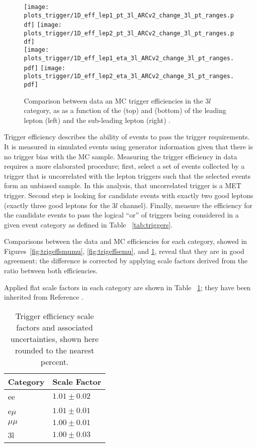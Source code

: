 \begin{figure}[htp]
\centering
\texttt{[image: plots\_trigger/1D\_eff\_lep1\_pt\_3l\_ARCv2\_change\_3l\_pt\_ranges.pdf]}
\texttt{[image: plots\_trigger/1D\_eff\_lep2\_pt\_3l\_ARCv2\_change\_3l\_pt\_ranges.pdf]} \\
\texttt{[image: plots\_trigger/1D\_eff\_lep1\_eta\_3l\_ARCv2\_change\_3l\_pt\_ranges.pdf]}
\texttt{[image: plots\_trigger/1D\_eff\_lep2\_eta\_3l\_ARCv2\_change\_3l\_pt\_ranges.pdf]}
\caption[Trigger efficiency for the $3l$ category]{Comparison between data an MC trigger efficiencies in the $3l$ category, as as a function of the \pt (top) and \etac (bottom) of the leading lepton (left) and the sub-leading lepton (right) \cite{CMS_AN_2017-029}.}
\label{fig:trigeffs3l}
\end{figure}

Trigger efficiency describes the ability of events to pass the trigger requirements. It is measured in simulated events using generator information given that there is no trigger bias with the MC sample. Measuring the trigger efficiency in data requires a more elaborated procedure; first, select a set of events collected by a trigger that is uncorrelated with the lepton triggers such that the selected events form an unbiased sample. In this analysis, that uncorrelated trigger is a MET trigger. Second step is looking for candidate events with exactly two good leptons (exactly three good leptons for the $3l$ channel). Finally,  measure the efficiency for the candidate events to pass the logical ``or'' of triggers being considered in a given event category as defined in Table ~\ref{tab:triggers}.

Comparisons between the data and MC efficiencies for each category, showed in Figures~\ref{fig:trigeffsmumu}, \ref{fig:trigeffsemu}, and \ref{fig:trigeffs3l}, reveal that they are in good agreement; the difference is corrected by applying scale factors derived from the ratio between both efficiencies.

Applied flat scale factors in each category are shown in Table ~\ref{tab:trigSFs}; they have been inherited from Reference \cite{CMS_AN_2017-029}. 
\begin{table}
\centering
\begin{tabular}{ll}
Category & Scale Factor \\\hline
    ee   & $1.01 \pm 0.02$ \\
e$\mu$   & $1.01 \pm 0.01$ \\
$\mu\mu$ & $1.00 \pm 0.01$ \\
3l       & $1.00 \pm 0.03$ \\\hline
\end{tabular}
\caption[Trigger efficiency scale factors and associated uncertainties.]{Trigger efficiency scale factors and associated uncertainties, shown here rounded to the nearest percent.}
\label{tab:trigSFs}
\end{table}

